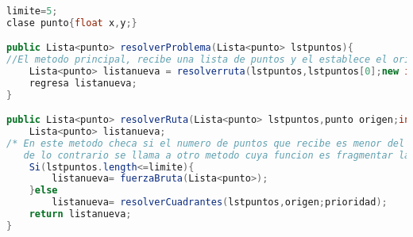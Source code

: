     \begin{lstlisting}[language=JAVA, caption=Pseudocodigo del Rectangulo aureo, label=lst:codigo10]

limite=5;     
clase punto{float x,y;} 

public Lista<punto> resolverProblema(Lista<punto> lstpuntos){
//El metodo principal, recibe una lista de puntos y el establece el origen y la prioridad
	Lista<punto> listanueva = resolverruta(lstpuntos,lstpuntos[0];new int[]{0,1,3,2});
	regresa listanueva;
}

public Lista<punto> resolverRuta(Lista<punto> lstpuntos,punto origen;int[] prioridad)){
	Lista<punto> listanueva;
/* En este metodo checa si el numero de puntos que recibe es menor del limite para resolverse, 
   de lo contrario se llama a otro metodo cuya funcion es fragmentar la lista */
	Si(lstpuntos.length<=limite){
		listanueva= fuerzaBruta(Lista<punto>);
	}else
		listanueva= resolverCuadrantes(lstpuntos,origen;prioridad);
	return listanueva;
}


\end{lstlisting}
